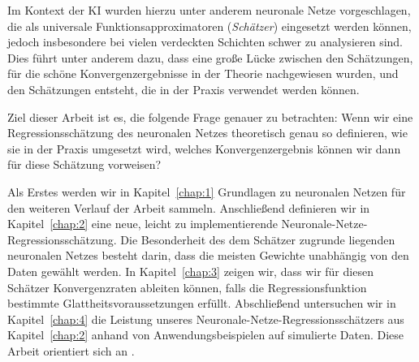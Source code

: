 Im Kontext der KI wurden hierzu unter anderem neuronale Netze vorgeschlagen, die als universale Funktionsapproximatoren (\emph{Schätzer}) eingesetzt werden können, jedoch insbesondere bei vielen verdeckten Schichten schwer zu analysieren sind. 
Dies führt unter anderem dazu, dass eine große Lücke zwischen den Schätzungen, für die schöne Konvergenzergebnisse in der Theorie nachgewiesen wurden, und den Schätzungen entsteht, die in der Praxis verwendet werden können.

Ziel dieser Arbeit ist es, die folgende Frage genauer zu betrachten: Wenn wir eine Regressionsschätzung des neuronalen Netzes theoretisch genau so definieren, wie sie in der Praxis umgesetzt wird, welches Konvergenzergebnis können wir dann für diese Schätzung vorweisen? 

Als Erstes werden wir in Kapitel~\ref{chap:1} Grundlagen zu neuronalen Netzen für den weiteren Verlauf der Arbeit sammeln.
Anschließend definieren wir in Kapitel~\ref{chap:2} eine neue, leicht zu implementierende Neuronale-Netze-Regressionsschätzung. Die Besonderheit des dem Schätzer zugrunde liegenden neuronalen Netzes besteht darin, dass die meisten Gewichte unabhängig von den Daten gewählt werden.
In Kapitel~\ref{chap:3} zeigen wir, dass wir für diesen Schätzer Konvergenzraten ableiten können, falls die Regressionsfunktion bestimmte Glattheitsvoraussetzungen erfüllt. 
Abschließend untersuchen wir in Kapitel~\ref{chap:4} die Leistung unseres Neuronale-Netze-Regressionsschätzers aus Kapitel~\ref{chap:2} anhand von Anwendungsbeispielen auf simulierte Daten. Diese Arbeit orientiert sich an \cite{kohler19}.